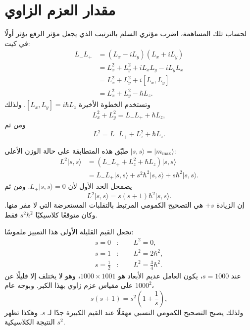 \section{مقدار العزم الزاوي}

\begin{classroomqa}
\end{classroomqa}

لحساب تلك المساهمة، اضرب مؤثري السلم بالترتيب الذي يجعل مؤثر الرفع يؤثر أولًا في كيت:
\begin{align}
L_-L_+
&=(L_x-iL_y)(L_x+iL_y) \\
&=L_x^2+L_y^2+iL_xL_y-iL_yL_x \\
&=L_x^2+L_y^2+i[L_x,L_y] \\
&=L_x^2+L_y^2-\hbar L_z.
\end{align}
وتستخدم الخطوة الأخيرة \([L_x,L_y]=i\hbar L_z\). ولذلك
\begin{equation}
L_x^2+L_y^2=L_-L_++\hbar L_z,
\end{equation}
ومن ثم
\begin{equation}
L^2=L_-L_++L_z^2+\hbar L_z.
\end{equation}

طبّق هذه المتطابقة على حالة الوزن الأعلى \(\lvert s,s\rangle=\lvert m_{\max}\rangle\):
\begin{align}
L^2\lvert s,s\rangle
&=\left(L_-L_++L_z^2+\hbar L_z\right)\lvert s,s\rangle \\
&=L_-L_+\lvert s,s\rangle
+s^2\hbar^2\lvert s,s\rangle
+s\hbar^2\lvert s,s\rangle.
\end{align}
يضمحل الحد الأول لأن \(L_+\lvert s,s\rangle=0\). ومن ثم
\begin{equation}
L^2\lvert s,s\rangle
=s(s+1)\hbar^2\lvert s,s\rangle.
\end{equation}
إن الزيادة \(+s\) هي التصحيح الكمومي المرتبط بالتقلبات المستعرضة التي لا مفر منها. وكان متوقعًا كلاسيكيًا \(s^2\hbar^2\) فقط.

تجعل القيم القليلة الأولى هذا التمييز ملموسًا:
\begin{align}
s=0 &: \qquad L^2=0,\\
s=1 &: \qquad L^2=2\hbar^2,\\
s=\frac12 &: \qquad L^2=\frac34\hbar^2.
\end{align}
عند \(s=1000\)، يكون العامل عديم الأبعاد هو \(1000\times1001\)، وهو لا يختلف إلا قليلًا عن \(1000^2\) على مقياس عزم زاوي بهذا الكبر. وبوجه عام،
\begin{equation}
s(s+1)=s^2\left(1+\frac1s\right),
\end{equation}
ولذلك يصبح التصحيح الكمومي النسبي مهمَلًا عند القيم الكبيرة جدًا لـ \(s\). وهكذا تظهر النتيجة الكلاسيكية \(s^2\).

